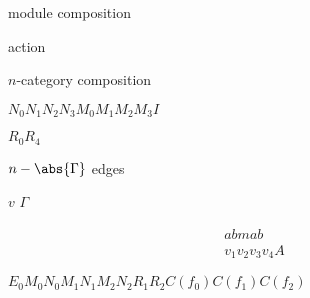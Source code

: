 \documentclass{amsart}
\begin{document}
\thispagestyle{empty}

module composition

action

$n$-category composition

\newcommand{\cN}{\mathcal{N}}
$N_0 N_1 N_2 N_3 M_0 M_1 M_2 M_3 I$

$R_0 R_4$

$n-\abs{\Gamma}$ edges

$v$
$\Gamma$

\begin{align*}
abmab & \\
v_1 v_2 v_3 v_4 A
\end{align*}

$E_0 M_0 N_0 M_1 N_1 M_2 N_2 R_1 R_2 C(f_0) C(f_1) C(f_2)$
\end{document}
